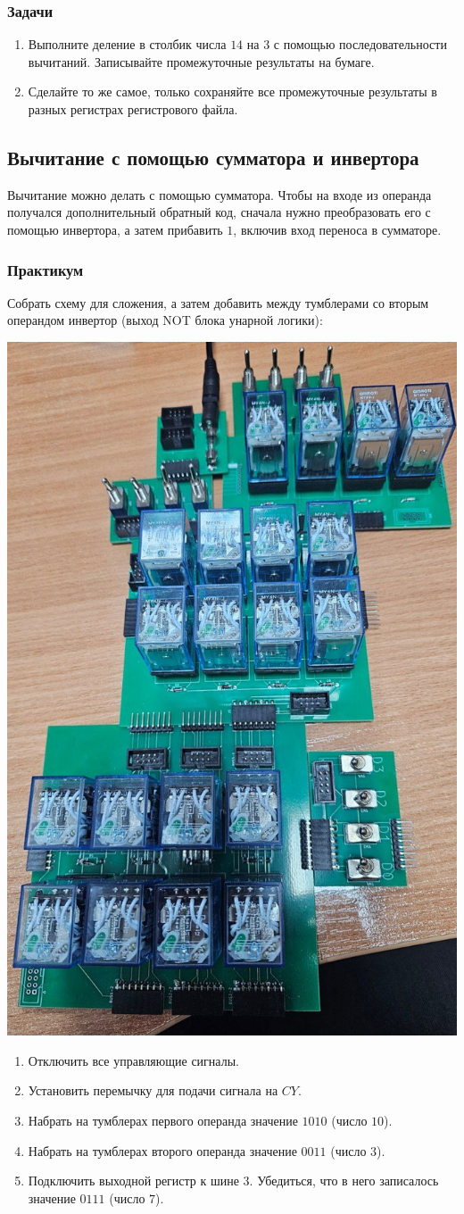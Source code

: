 \subsubsection{Задачи}
\begin{enumerate}
    \item Выполните деление в столбик числа $14$ на $3$ с помощью последовательности вычитаний.
          Записывайте промежуточные результаты на бумаге.
    \item Сделайте то же самое, только сохраняйте все промежуточные результаты в разных
          регистрах регистрового файла.
\end{enumerate}

\subsection{Вычитание с помощью сумматора и инвертора}

Вычитание можно делать с помощью сумматора. Чтобы на входе из операнда получался дополнительный
обратный код, сначала нужно преобразовать его с помощью инвертора, а затем прибавить $1$,
включив вход переноса в сумматоре.

\subsubsection{Практикум}

Собрать схему для сложения, а затем добавить между тумблерами со вторым операндом
инвертор (выход NOT блока унарной логики):

\includegraphics[width=0.5\columnwidth]{photo/subtractor.jpg}

\begin{enumerate}
    \item Отключить все управляющие сигналы.
    \item Установить перемычку для подачи сигнала на $CY$.
    \item Набрать на тумблерах первого операнда значение $1010$ (число $10$).
    \item Набрать на тумблерах второго операнда значение $0011$ (число $3$).
    \item Подключить выходной регистр к шине $3$. Убедиться, что в него записалось значение $0111$ (число $7$).
\end{enumerate}
